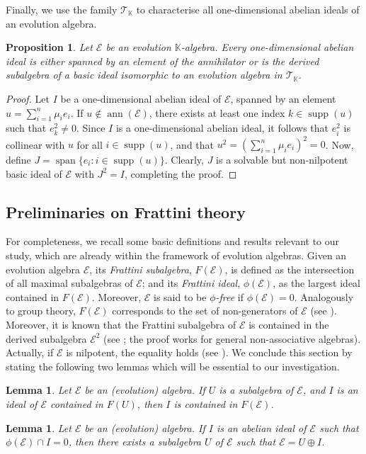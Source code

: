 \documentclass[12pt,reqno]{amsart}
\newtheorem{proposition}[theorem]{Proposition}
\newtheorem{lemma}[theorem]{Lemma}
\theoremstyle{definition}
\theoremstyle{remark}
\DeclareMathOperator{\ann}{ann}
\DeclareMathOperator{\spa}{span}
\DeclareMathOperator{\supp}{supp}
\numberwithin{equation}{section}
\begin{document}
Finally, we use the family $\mathcal{T}_\mathbb{K}$ to characterise all one-dimensional abelian ideals of an evolution algebra.
\begin{proposition}\label{prop:ab_ideals}
	Let $\mathcal{E}$ be an evolution $\mathbb{K}$-algebra. Every one-dimensional abelian ideal is either spanned by an element of the annihilator or is the derived subalgebra of a basic ideal isomorphic to an evolution algebra in $\mathcal{T}_\mathbb{K}$.
\end{proposition}
\begin{proof}
	Let $I$ be a one-dimensional abelian ideal of $\mathcal{E}$, spanned by an element $u=\sum_{i=1}^n\mu_ie_i$. If $u\notin\ann(\mathcal{E})$, there exists at least one index $k\in\supp(u)$ such that $e_k^2\neq0$. Since $I$ is a one-dimensional abelian ideal, it follows that $e_i^2$ is collinear with $u$ for all $i\in\supp(u)$, and that $u^2=(\sum_{i=1}^n\mu_ie_i)^2=0$.
	Now, define $J=\spa\{e_i\colon i\in\supp(u)\}$. Clearly, $J$ is a solvable but non-nilpotent basic ideal of $\mathcal{E}$ with $J^2=I$, completing the proof.
\end{proof}
\subsection{Preliminaries on Frattini theory} For completeness, we recall some
basic definitions and results relevant to our study, which are already within the framework
of evolution algebras. Given an evolution algebra $\mathcal{E}$, its \textit{Frattini subalgebra}, $F(\mathcal{E})$, is defined as the intersection of all maximal subalgebras of $\mathcal{E}$; and its \textit{Frattini ideal}, $\phi(\mathcal{E})$, as the largest ideal contained in $F(\mathcal{E})$. Moreover, $\mathcal{E}$ is said to be \textit{$\phi$-free} if $\phi(\mathcal{E})=0$. Analogously to group theory, $F(\mathcal{E})$ corresponds to the set of non-generators of $\mathcal{E}$ (see \cite[Theorem~1]{T_71_frat}). Moreover, it is known that the Frattini subalgebra of $\mathcal{E}$ is contained in the derived subalgebra $\mathcal{E}^2$ (see \cite[Lemma~1]{M_67_frat}; the proof works for general non-associative algebras). Actually, if $\mathcal{E}$ is nilpotent, the equality holds (see \cite[Theorem~6]{T_71_frat}).
We conclude this section by stating the following two lemmas which will be essential to our investigation.
\begin{lemma}{\cite[Lemma~4.1]{frat_towers}}\label{lem:frat1}
Let $\mathcal{E}$ be an (evolution) algebra. If $U$ is a subalgebra of $\mathcal{E}$, and $I$ is an ideal of $\mathcal{E}$ contained in $F(U)$, then $I$ is contained in $F(\mathcal{E})$.
\end{lemma}
\begin{lemma}{\cite[Lemma~7.2]{frat_towers}}\label{lem:frat2}
Let $\mathcal{E}$ be an (evolution) algebra. If $I$ is an abelian ideal of $\mathcal{E}$ such that $\phi(\mathcal{E})\cap I=0$, then there exists a subalgebra $U$ of $\mathcal{E}$ such that $\mathcal{E}=U\oplus I$.
\end{lemma}
\end{document}
